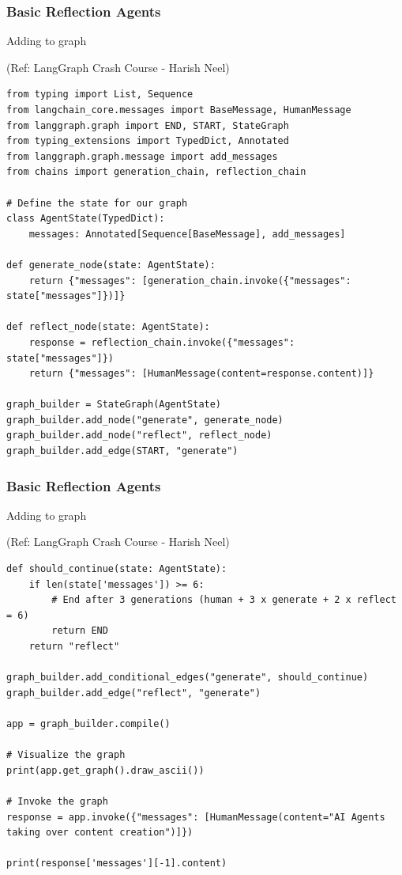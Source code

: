 \begin{frame}[fragile]\frametitle{Basic Reflection Agents}

Adding to graph

{\tiny (Ref: LangGraph Crash Course - Harish Neel)}

\begin{lstlisting}[basicstyle=\scriptsize\ttfamily]
from typing import List, Sequence
from langchain_core.messages import BaseMessage, HumanMessage
from langgraph.graph import END, START, StateGraph
from typing_extensions import TypedDict, Annotated
from langgraph.graph.message import add_messages
from chains import generation_chain, reflection_chain

# Define the state for our graph
class AgentState(TypedDict):
    messages: Annotated[Sequence[BaseMessage], add_messages]

def generate_node(state: AgentState):
    return {"messages": [generation_chain.invoke({"messages": state["messages"]})]}

def reflect_node(state: AgentState):
    response = reflection_chain.invoke({"messages": state["messages"]})
    return {"messages": [HumanMessage(content=response.content)]}

graph_builder = StateGraph(AgentState)
graph_builder.add_node("generate", generate_node)
graph_builder.add_node("reflect", reflect_node)
graph_builder.add_edge(START, "generate")
\end{lstlisting}
\end{frame}
\begin{frame}[fragile]\frametitle{Basic Reflection Agents}

Adding to graph

{\tiny (Ref: LangGraph Crash Course - Harish Neel)}

\begin{lstlisting}[basicstyle=\scriptsize\ttfamily]
def should_continue(state: AgentState):
    if len(state['messages']) >= 6:
        # End after 3 generations (human + 3 x generate + 2 x reflect = 6)
        return END
    return "reflect"

graph_builder.add_conditional_edges("generate", should_continue)
graph_builder.add_edge("reflect", "generate")

app = graph_builder.compile()

# Visualize the graph
print(app.get_graph().draw_ascii())

# Invoke the graph
response = app.invoke({"messages": [HumanMessage(content="AI Agents taking over content creation")]})

print(response['messages'][-1].content)
\end{lstlisting}
\end{frame}
